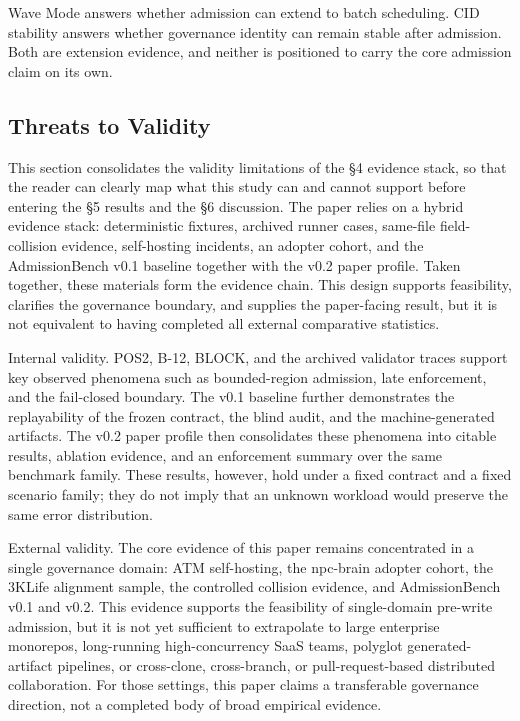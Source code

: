 \documentclass[9pt,letterpaper]{extarticle}
\begin{document}
Wave Mode answers whether admission can extend to batch scheduling. CID stability answers whether governance identity can remain stable after admission. Both are extension evidence, and neither is positioned to carry the core admission claim on its own.

\subsection{Threats to Validity}

This section consolidates the validity limitations of the §4 evidence stack, so that the reader can clearly map what this study can and cannot support before entering the §5 results and the §6 discussion. The paper relies on a hybrid evidence stack: deterministic fixtures, archived runner cases, same-file field-collision evidence, self-hosting incidents, an adopter cohort, and the AdmissionBench v0.1 baseline together with the v0.2 paper profile. Taken together, these materials form the evidence chain. This design supports feasibility, clarifies the governance boundary, and supplies the paper-facing result, but it is not equivalent to having completed all external comparative statistics.

Internal validity. POS2, B-12, BLOCK, and the archived validator traces support key observed phenomena such as bounded-region admission, late enforcement, and the fail-closed boundary. The v0.1 baseline further demonstrates the replayability of the frozen contract, the blind audit, and the machine-generated artifacts. The v0.2 paper profile then consolidates these phenomena into citable results, ablation evidence, and an enforcement summary over the same benchmark family. These results, however, hold under a fixed contract and a fixed scenario family; they do not imply that an unknown workload would preserve the same error distribution.

External validity. The core evidence of this paper remains concentrated in a single governance domain: ATM self-hosting, the npc-brain adopter cohort, the 3KLife alignment sample, the controlled collision evidence, and AdmissionBench v0.1 and v0.2. This evidence supports the feasibility of single-domain pre-write admission, but it is not yet sufficient to extrapolate to large enterprise monorepos, long-running high-concurrency SaaS teams, polyglot generated-artifact pipelines, or cross-clone, cross-branch, or pull-request-based distributed collaboration. For those settings, this paper claims a transferable governance direction, not a completed body of broad empirical evidence.
\end{document}
